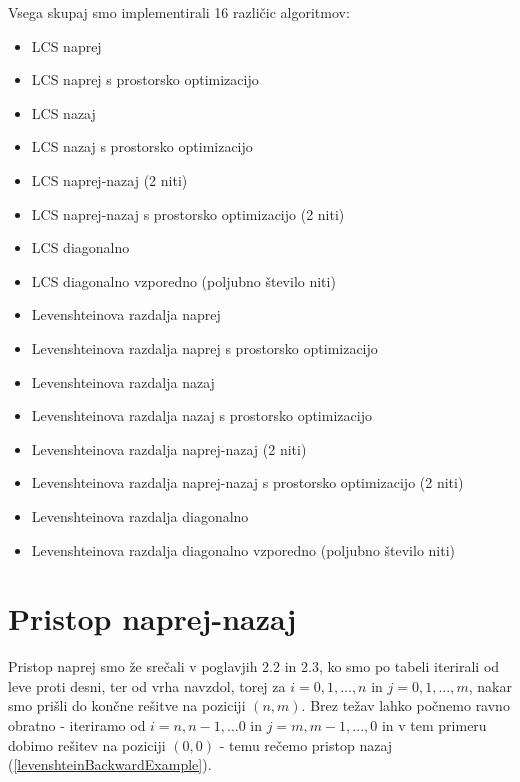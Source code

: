 \documentclass[a4paper,12pt,openright]{book}
\begin{document}
Vsega skupaj smo implementirali 16 različic algoritmov:
\begin{itemize}
  \item LCS naprej 
  \item LCS naprej s prostorsko optimizacijo
  \item LCS nazaj 
  \item LCS nazaj s prostorsko optimizacijo
  \item LCS naprej-nazaj (2 niti)
  \item LCS naprej-nazaj s prostorsko optimizacijo (2 niti)
  \item LCS diagonalno 
  \item LCS diagonalno vzporedno (poljubno število niti)
  \item Levenshteinova razdalja naprej 
  \item Levenshteinova razdalja naprej s prostorsko optimizacijo
  \item Levenshteinova razdalja nazaj 
  \item Levenshteinova razdalja nazaj s prostorsko optimizacijo
  \item Levenshteinova razdalja naprej-nazaj (2 niti)
  \item Levenshteinova razdalja naprej-nazaj s prostorsko optimizacijo (2 niti)
  \item Levenshteinova razdalja diagonalno
  \item Levenshteinova razdalja diagonalno vzporedno (poljubno število niti)
\end{itemize}

\section{Pristop naprej-nazaj}

Pristop naprej smo že srečali v poglavjih 2.2 in 2.3, ko smo po tabeli iterirali od leve proti desni, ter od vrha navzdol, torej za \begin{math}i = 0, 1, ..., n\end{math} in \begin{math}j = 0, 1, ..., m\end{math}, nakar smo prišli do končne rešitve na poziciji \begin{math}(n, m)\end{math}. Brez težav lahko počnemo ravno obratno - iteriramo od \begin{math}i = n, n-1, ... 0\end{math} in \begin{math}j = m, m-1, ..., 0\end{math} in v tem primeru dobimo rešitev na poziciji \begin{math}(0, 0)\end{math} - temu rečemo pristop nazaj (\ref{levenshteinBackwardExample}). 
\end{document}
